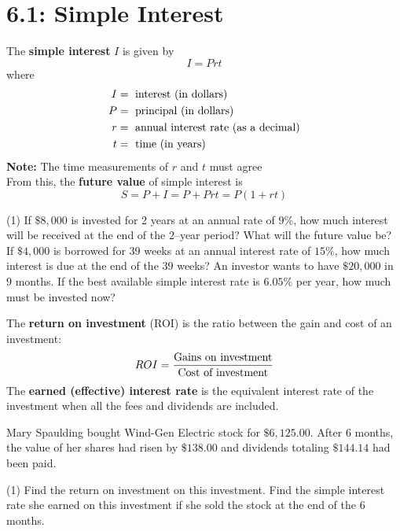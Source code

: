 \documentclass[../mathNotesPreamble]{subfiles}
\providecommand{\relscalefact}{1.4}
\begin{document}
\relscale{\relscalefact}
  \section{6.1: Simple Interest}
  \begin{defn*}
    The \textbf{simple interest} $I$ is given by
      \[I=Prt\]
    where
      \begin{align*}
        I&=\textnormal{ interest (in dollars) }\\
        P&=\textnormal{ principal (in dollars) }\\
        r&=\textnormal{ annual interest rate (as a decimal)}\\
        t&=\textnormal{ time (in years)}
      \end{align*}
    \textbf{Note: } The time measurements of $r$ and $t$ must agree\\
    
    From this, the \textbf{future value} of simple interest is
      \[S=P+I=P+Prt=P(1+rt)\]
  \end{defn*}
  \pagebreak
  
  \begin{ex*}\mbox{}
    \begin{extasks}[after-item-skip=\stretch{1}](1)
      \task If $\$8,000$ is invested for 2 years at an annual rate of $9\%$, how much interest will be received at the end of the $2$--year period? What will the future value be?
      \task If $\$4,000$ is borrowed for 39 weeks at an annual interest rate of $15\%$, how much interest is due at the end of the $39$ weeks? 
      \task An investor wants to have $\$20,000$ in $9$ months. If the best available simple interest rate is $6.05\%$ per year, how much must be invested now?
    \end{extasks}
  \end{ex*}
  \pagebreak

  \begin{defn*}
    The \textbf{return on investment} (ROI) is the ratio between the gain and cost of an investment:
      \[ROI=\frac{\textnormal{Gains on investment}}{\textnormal{Cost of investment}}\]
    The \textbf{earned (effective) interest rate} is the equivalent interest rate of the investment when all the fees and dividends are included.
  \end{defn*}
  \begin{ex*}
    Mary Spaulding bought Wind-Gen Electric stock for $\$6,125.00$. After $6$ months, the value of her shares had risen by $\$138.00$ and dividends totaling $\$144.14$ had been paid.
  \end{ex*}
  \begin{extasks}[after-item-skip=\stretch{1}](1)
    \task Find the return on investment on this investment.
    \task Find the simple interest rate she earned on this investment if she sold the stock at the end of the $6$ months.
  \end{extasks}
  \pagebreak
  
\end{document}
